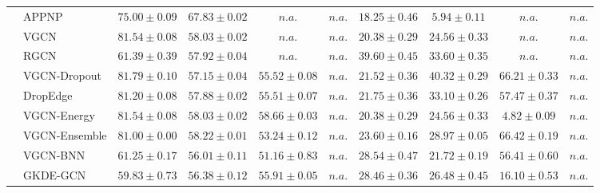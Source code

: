 \begin{table*}[!h]
{\begin{tabular}{ll|cccc|cccc}
        & APPNP & ${75.00\scriptscriptstyle \pm 0.09}$ & ${{67.83}\scriptscriptstyle \pm 0.02}$ & $n.a.$ & $n.a.$ & ${18.25\scriptscriptstyle \pm 0.46}$ & ${5.94\scriptscriptstyle \pm 0.11}$ & $n.a.$ & $n.a.$\\
        & VGCN & ${81.54\scriptscriptstyle \pm 0.08}$ & ${58.03\scriptscriptstyle \pm 0.02}$ & $n.a.$ & $n.a.$ & ${20.38\scriptscriptstyle \pm 0.29}$ & ${24.56\scriptscriptstyle \pm 0.33}$ & $n.a.$ & $n.a.$\\
        & RGCN & ${61.39\scriptscriptstyle \pm 0.39}$ & ${57.92\scriptscriptstyle \pm 0.04}$ & $n.a.$ & $n.a.$ & ${39.60\scriptscriptstyle \pm 0.45}$ & ${33.60\scriptscriptstyle \pm 0.35}$ & $n.a.$ & $n.a.$\\
        & VGCN-Dropout & ${\mathbf{81.79}\scriptscriptstyle \pm 0.10}$ & ${57.15\scriptscriptstyle \pm 0.04}$ & ${55.52\scriptscriptstyle \pm 0.08}$ & $n.a.$ & ${21.52\scriptscriptstyle \pm 0.36}$ & ${40.32\scriptscriptstyle \pm 0.29}$ & ${66.21\scriptscriptstyle \pm 0.33}$ & $n.a.$\\
        & DropEdge & ${81.20\scriptscriptstyle \pm 0.08}$ & ${57.88\scriptscriptstyle \pm 0.02}$ & ${55.51\scriptscriptstyle \pm 0.07}$ & $n.a.$ & ${21.75\scriptscriptstyle \pm 0.36}$ & ${33.10\scriptscriptstyle \pm 0.26}$ & ${57.47\scriptscriptstyle \pm 0.37}$ & $n.a.$\\
        & VGCN-Energy & ${81.54\scriptscriptstyle \pm 0.08}$ & ${58.03\scriptscriptstyle \pm 0.02}$ & ${58.66\scriptscriptstyle \pm 0.03}$ & $n.a.$ & ${20.38\scriptscriptstyle \pm 0.29}$ & ${24.56\scriptscriptstyle \pm 0.33}$ & ${4.82\scriptscriptstyle \pm 0.09}$ & $n.a.$\\
        & VGCN-Ensemble & ${81.00\scriptscriptstyle \pm 0.00}$ & ${58.22\scriptscriptstyle \pm 0.01}$ & ${53.24\scriptscriptstyle \pm 0.12}$ & $n.a.$ & ${23.60\scriptscriptstyle \pm 0.16}$ & ${28.97\scriptscriptstyle \pm 0.05}$ & ${66.42\scriptscriptstyle \pm 0.19}$ & $n.a.$\\
        & VGCN-BNN & ${61.25\scriptscriptstyle \pm 0.17}$ & ${56.01\scriptscriptstyle \pm 0.11}$ & ${51.16\scriptscriptstyle \pm 0.83}$ & $n.a.$ & ${28.54\scriptscriptstyle \pm 0.47}$ & ${21.72\scriptscriptstyle \pm 0.19}$ & ${56.41\scriptscriptstyle \pm 0.60}$ & $n.a.$\\
        & GKDE-GCN & ${59.83\scriptscriptstyle \pm 0.73}$ & ${56.38\scriptscriptstyle \pm 0.12}$ & ${55.91\scriptscriptstyle \pm 0.05}$ & $n.a.$ & ${28.46\scriptscriptstyle \pm 0.36}$ & ${26.48\scriptscriptstyle \pm 0.45}$ & ${16.10\scriptscriptstyle \pm 0.53}$ & $n.a.$\\

\end{tabular}}
\end{table*}
